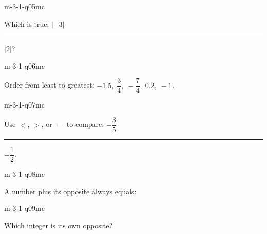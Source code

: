 \begin{practiceQuestion}{m-3-1-q05}{mc}
\begin{questionText}
Which is true: $|-3|$ \rule{0.5cm}{0.4pt} $|2|$?
\end{questionText}
\end{practiceQuestion}

\begin{practiceQuestion}{m-3-1-q06}{mc}
\begin{questionText}
Order from least to greatest: $-1.5, \; \dfrac{3}{4}, \; -\dfrac{7}{4}, \; 0.2, \; -1$.
\end{questionText}
\end{practiceQuestion}

\begin{practiceQuestion}{m-3-1-q07}{mc}
\begin{questionText}
Use $<$, $>$, or $=$ to compare: $-\dfrac{3}{5}$ \rule{0.5cm}{0.4pt} $-\dfrac{1}{2}$.
\end{questionText}
\end{practiceQuestion}

\begin{practiceQuestion}{m-3-1-q08}{mc}
\begin{questionText}
A number plus its opposite always equals:
\end{questionText}
\end{practiceQuestion}

\begin{practiceQuestion}{m-3-1-q09}{mc}
\begin{questionText}
Which integer is its own opposite?
\end{questionText}
\end{practiceQuestion}

